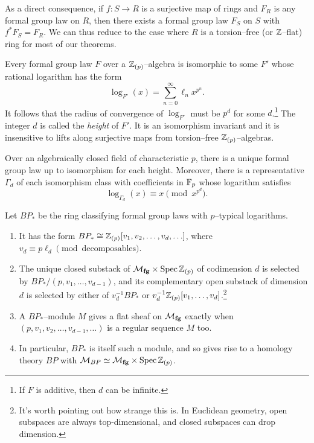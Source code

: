 \noindent As a direct consequence, if $f: S \to R$ is a surjective map of rings and $F_R$ is any formal group law on $R$, then there exists a formal group law $F_S$ on $S$ with $f^* F_S = F_R$.  We can thus reduce to the case where $R$ is a torsion--free (or $\mathbb Z$--flat) ring for most of our theorems.

\begin{theorem}[Hazewinkel]
Every formal group law $F$ over a $\mathbb Z_{(p)}$--algebra is isomorphic to some $F'$ whose rational logarithm has the form \[\log_{F'}(x) = \sum_{n=0}^\infty \ell_n x^{p^n}.\]  It follows that the radius of convergence of $\log_{F'}$ must be $p^d$ for some $d$.\footnote{If $F$ is additive, then $d$ can be infinite.}  The integer $d$ is called the \emph{height} of $F'$.  It is an isomorphism invariant and it is insensitive to lifts along surjective maps from torsion--free $\mathbb Z_{(p)}$--algebras.
\end{theorem}

\begin{theorem}
Over an algebraically closed field of characteristic $p$, there is a unique formal group law up to isomorphism for each height.  Moreover, there is a representative $\Gamma_d$ of each isomorphism class with coefficients in $\mathbb F_p$ whose logarithm satisfies \[\log_{\Gamma_d}(x) \equiv x \pmod{x^{p^d}}.\]
\end{theorem}

\begin{theorem}
Let $BP_*$ be the ring classifying formal group laws with $p$--typical logarithms.
\begin{enumerate}
\item It has the form $BP_* \cong \mathbb Z_{(p)}[v_1, v_2, \ldots, v_d, \ldots]$, where $v_d \equiv p \ell_d \pmod{\text{decomposables}}$.
\item The unique closed substack of $\mathcal{M}_{\mathbf{fg}} \times \operatorname{Spec} \mathbb Z_{(p)}$ of codimension $d$ is selected by $BP_* / (p, v_1, \ldots, v_{d-1})$, and its complementary open substack of dimension $d$ is selected by either of $v_d^{-1} BP_*$ or $v_d^{-1} \mathbb Z_{(p)}[v_1, \ldots, v_d]$.\footnote{It's worth pointing out how strange this is. In Euclidean geometry, open subspaces are always top-dimensional, and closed subspaces can drop dimension.}
\item A $BP_*$--module $M$ gives a flat sheaf on $\mathcal{M}_{\mathbf{fg}}$ exactly when $(p, v_1, v_2, \ldots, v_{d-1}, \ldots)$ is a regular sequence $M$ too.
\item In particular, $BP_*$ is itself such a module, and so gives rise to a homology theory $BP$ with $\mathcal{M}_{BP} \simeq \mathcal{M}_{\mathbf{fg}} \times \operatorname{Spec} \mathbb Z_{(p)}$.
\end{enumerate}
\end{theorem}

